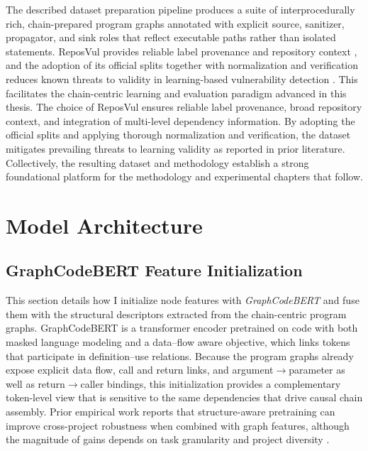 \documentclass{buthesis}
\begin{document}
The described dataset preparation pipeline produces a suite of interprocedurally rich, chain-prepared program graphs annotated with explicit source, sanitizer, propagator, and sink roles that reflect executable paths rather than isolated statements. ReposVul provides reliable label provenance and repository context \cite{wang2024reposvul}, and the adoption of its official splits together with normalization and verification reduces known threats to validity in learning-based vulnerability detection \cite{Chakraborty2020,Li2022Empirical}. This facilitates the chain-centric learning and evaluation paradigm advanced in this thesis. The choice of ReposVul ensures reliable label provenance, broad repository context, and integration of multi-level dependency information. By adopting the official splits and applying thorough normalization and verification, the dataset mitigates prevailing threats to learning validity as reported in prior literature. Collectively, the resulting dataset and methodology establish a strong foundational platform for the methodology and experimental chapters that follow.




\section{Model Architecture}
\label{sec:model-arch}

\subsection{GraphCodeBERT Feature Initialization}
\label{sec:model-arch-gcbert}

This section details how I initialize node features with \emph{GraphCodeBERT} \cite{guo2021graphcodebert} and fuse them with the structural descriptors extracted from the chain-centric program graphs. GraphCodeBERT is a transformer encoder pretrained on code with both masked language modeling and a data–flow aware objective, which links tokens that participate in definition–use relations. Because the program graphs already expose explicit data flow, call and return links, and argument$\rightarrow$parameter as well as return$\rightarrow$caller bindings, this initialization provides a complementary token-level view that is sensitive to the same dependencies that drive causal chain assembly. Prior empirical work reports that structure-aware pretraining can improve cross-project robustness when combined with graph features, although the magnitude of gains depends on task granularity and project diversity \cite{Li2022Empirical}.
\end{document}
